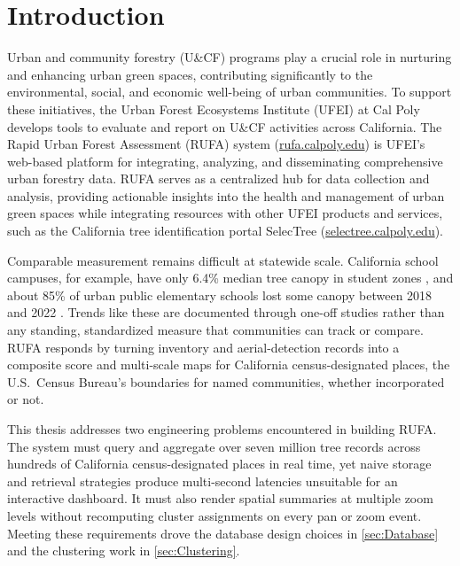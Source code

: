 \chapter{Introduction} \label{sec:Introduction}

Urban and community forestry (U\&CF) programs play a crucial role in nurturing and enhancing urban green spaces, contributing significantly to the environmental, social, and economic well-being of urban communities. To support these initiatives, the Urban Forest Ecosystems Institute (UFEI) at Cal Poly develops tools to evaluate and report on U\&CF activities across California. The Rapid Urban Forest Assessment (RUFA) system (\href{https://rufa.calpoly.edu}{rufa.calpoly.edu}) is UFEI's web-based platform for integrating, analyzing, and disseminating comprehensive urban forestry data. RUFA serves as a centralized hub for data collection and analysis, providing actionable insights into the health and management of urban green spaces while integrating resources with other UFEI products and services, such as the California tree identification portal SelecTree (\href{https://selectree.calpoly.edu}{selectree.calpoly.edu}).

Comparable measurement remains difficult at statewide scale. California school campuses, for example, have only 6.4\% median tree canopy in student zones \cite{greenSchoolyards2024}, and about 85\% of urban public elementary schools lost some canopy between 2018 and 2022 \cite{velasquez2025}. Trends like these are documented through one-off studies rather than any standing, standardized measure that communities can track or compare. RUFA responds by turning inventory and aerial-detection records into a composite score and multi-scale maps for California census-designated places, the U.S.\ Census Bureau's boundaries for named communities, whether incorporated or not.

This thesis addresses two engineering problems encountered in building RUFA. The system must query and aggregate over seven million tree records across hundreds of California census-designated places in real time, yet naive storage and retrieval strategies produce multi-second latencies unsuitable for an interactive dashboard. It must also render spatial summaries at multiple zoom levels without recomputing cluster assignments on every pan or zoom event. Meeting these requirements drove the database design choices in \autoref{sec:Database} and the clustering work in \autoref{sec:Clustering}.

